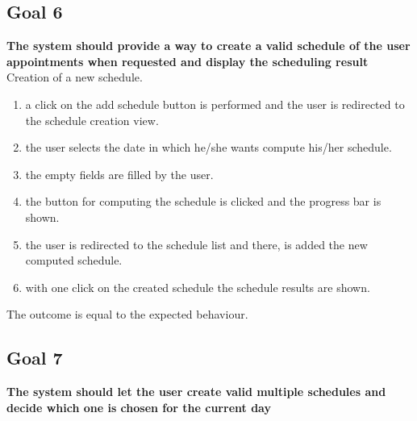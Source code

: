 

\subsection{Goal 6}
\textbf{The system should provide a way to create a valid schedule of the user appointments when requested and display the scheduling result}\\

{Creation of a new schedule.}
{{\begin{enumerate}
\item a click on the add schedule button is performed and the user is redirected to the schedule creation view.
\item the user selects the date in which he/she wants compute his/her schedule.
\item the empty fields are filled by the user.
\item the button for computing the schedule is clicked and the progress bar is shown.
\item the user is redirected to the schedule list and there, is added the new computed schedule.
\item with one click on the created schedule the schedule results are shown.
\end{enumerate}}}
{The outcome is equal to the expected behaviour.}

\subsection{Goal 7}
\textbf{The system should let the user create valid multiple schedules and decide which one is chosen for the current day}\\

